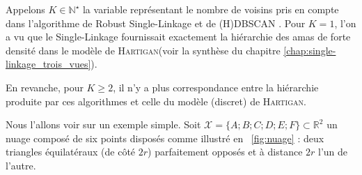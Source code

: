 Appelons $K\in \mathbb N^\star$ la variable représentant le nombre de voisins pris en compte dans l'algorithme de Robust Single-Linkage \cite{RobustSingleLinkage2010} et de (H)DBSCAN \cite{HDBSCAN, HDBSCAN2017}.
Pour $K = 1$, l'on a vu que le Single-Linkage fournissait exactement la hiérarchie des amas de forte densité dans le modèle de \textsc{Hartigan}(voir la synthèse du chapitre \ref{chap:single-linkage_trois_vues}).

En revanche, pour $K\ge2$, il n'y a plus correspondance entre la hiérarchie produite par ces algorithmes et celle du modèle (discret) de \textsc{Hartigan}. 

Nous l'allons voir sur un exemple simple. Soit $\mathcal X = \bigl\{ A ; B ; C ; D ; E ; F\bigr\} \subset \mathbb R^2$ un nuage composé de six points disposés comme illustré en \Fig~\ref{fig:nuage} : deux triangles équilatéraux (de côté $2r$) parfaitement opposés et à distance $2r$ l'un de l'autre.


